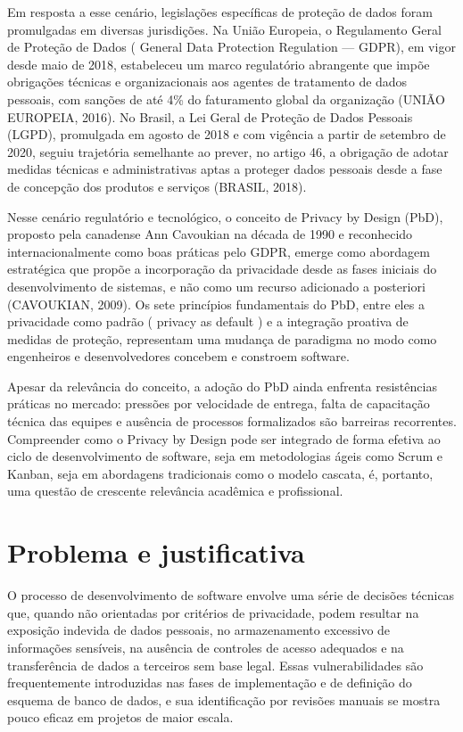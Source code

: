 \documentclass[oneside]{normas-utf-tex}
\begin{document}
Em resposta a esse cenário, legislações específicas de proteção de dados foram promulgadas em diversas jurisdições. Na União Europeia, o Regulamento Geral de Proteção de Dados ( General Data Protection Regulation — GDPR), em vigor desde maio de 2018, estabeleceu um marco regulatório abrangente que impõe obrigações técnicas e organizacionais aos agentes de tratamento de dados pessoais, com sanções de até 4\% do faturamento global da organização (UNIÃO EUROPEIA, 2016). No Brasil, a Lei Geral de Proteção de Dados Pessoais (LGPD), promulgada em agosto de 2018 e com vigência a partir de setembro de 2020, seguiu trajetória semelhante ao prever, no artigo 46, a obrigação de adotar medidas técnicas e administrativas aptas a proteger dados pessoais desde a fase de concepção dos produtos e serviços (BRASIL, 2018).

Nesse cenário regulatório e tecnológico, o conceito de Privacy by Design (PbD), proposto pela canadense Ann Cavoukian na década de 1990 e reconhecido internacionalmente como boas práticas pelo GDPR, emerge como abordagem estratégica que propõe a incorporação da privacidade desde as fases iniciais do desenvolvimento de sistemas, e não como um recurso adicionado a posteriori (CAVOUKIAN, 2009). Os sete princípios fundamentais do PbD, entre eles a privacidade como padrão ( privacy as default ) e a integração proativa de medidas de proteção, representam uma mudança de paradigma no modo como engenheiros e desenvolvedores concebem e constroem software.

Apesar da relevância do conceito, a adoção do PbD ainda enfrenta resistências práticas no mercado: pressões por velocidade de entrega, falta de capacitação técnica das equipes e ausência de processos formalizados são barreiras recorrentes. Compreender como o Privacy by Design pode ser integrado de forma efetiva ao ciclo de desenvolvimento de software, seja em metodologias ágeis como Scrum e Kanban, seja em abordagens tradicionais como o modelo cascata, é, portanto, uma questão de crescente relevância acadêmica e profissional.

\section{Problema e justificativa}

O processo de desenvolvimento de software envolve uma série de decisões técnicas que, quando não orientadas por critérios de privacidade, podem resultar na exposição indevida de dados pessoais, no armazenamento excessivo de informações sensíveis, na ausência de controles de acesso adequados e na transferência de dados a terceiros sem base legal. Essas vulnerabilidades são frequentemente introduzidas nas fases de implementação e de definição do esquema de banco de dados, e sua identificação por revisões manuais se mostra pouco eficaz em projetos de maior escala.
\end{document}
